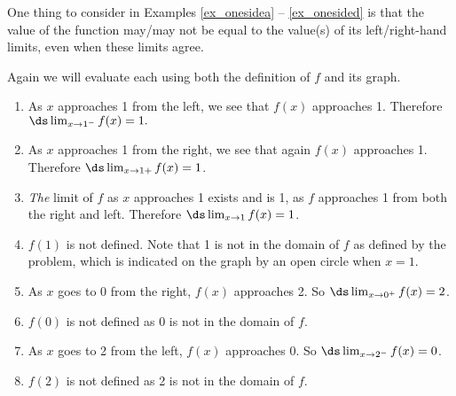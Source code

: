 One thing to consider in Examples \ref{ex_onesidea} -- \ref{ex_onesided} is that the value of the function may/may not be equal to the value(s) of its left/right-hand limits, even when these limits agree. \\

{Again we will evaluate each using both the definition of $f$ and its graph.
\begin{enumerate}
	\item	As $x$ approaches 1 from the left, we see that $f(x)$ approaches 1. Therefore $\ds \lim_{x\to 1^-} f(x)=1.$
	\item	As $x$ approaches 1 from the right, we see that again $f(x)$ approaches 1. Therefore $\ds \lim_{x\to 1+} f(x)=1$.
	\item	\textit{The} limit of $f$ as $x$ approaches 1 exists and is 1, as $f$ approaches 1 from both the right and left. Therefore $\ds \lim_{x\to 1} f(x)=1$.
	\item	$f(1)$ is not defined. Note that 1 is not in the domain of $f$ as defined by the problem, which is indicated on the graph by an open circle when $x=1$.
	\item	As $x$ goes to 0 from the right, $f(x)$ approaches 2. So $\ds \lim_{x\to 0^+} f(x)=2$.
	\item	$f(0)$  is not defined as $0$ is not in the domain of $f$.
	\item	As $x$ goes to 2 from the left, $f(x)$ approaches 0. So $\ds \lim_{x\to 2^-} f(x)=0$.
	\item	$f(2)$  is not defined as 2 is not in the domain of $f$.
\end{enumerate}}

